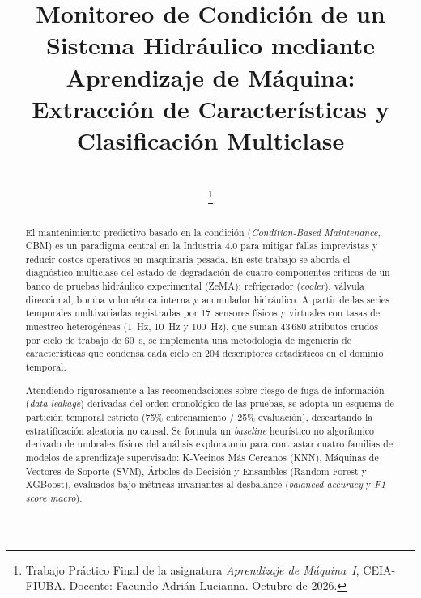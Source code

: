 \documentclass[journal]{IEEEtran}
\begin{document}
\title{Monitoreo de Condición de un Sistema Hidráulico mediante Aprendizaje de Máquina: Extracción de Características y Clasificación Multiclase}

\author{
     \\
    \thanks{Trabajo Práctico Final de la asignatura \emph{Aprendizaje de Máquina~I}, CEIA-FIUBA. Docente: Facundo Adrián Lucianna. Octubre de 2026.}
}

\maketitle

\begin{abstract}
El mantenimiento predictivo basado en la condición (\emph{Condition-Based Maintenance}, CBM) es un paradigma central en la Industria 4.0 para mitigar fallas imprevistas y reducir costos operativos en maquinaria pesada. En este trabajo se aborda el diagnóstico multiclase del estado de degradación de cuatro componentes críticos de un banco de pruebas hidráulico experimental (ZeMA): refrigerador (\emph{cooler}), válvula direccional, bomba volumétrica interna y acumulador hidráulico. A partir de las series temporales multivariadas registradas por 17~sensores físicos y virtuales con tasas de muestreo heterogéneas (\SI{1}{\hertz}, \SI{10}{\hertz} y \SI{100}{\hertz}), que suman 43\,680 atributos crudos por ciclo de trabajo de \SI{60}{\second}, se implementa una metodología de ingeniería de características que condensa cada ciclo en 204 descriptores estadísticos en el dominio temporal. 

Atendiendo rigurosamente a las recomendaciones sobre riesgo de fuga de información (\emph{data leakage}) derivadas del orden cronológico de las pruebas, se adopta un esquema de partición temporal estricto (75\% entrenamiento / 25\% evaluación), descartando la estratificación aleatoria no causal. Se formula un \emph{baseline} heurístico no algorítmico derivado de umbrales físicos del análisis exploratorio para contrastar cuatro familias de modelos de aprendizaje supervisado: K-Vecinos Más Cercanos (KNN), Máquinas de Vectores de Soporte (SVM), Árboles de Decisión y Ensambles (Random Forest y XGBoost), evaluados bajo métricas invariantes al desbalance (\emph{balanced accuracy} y \emph{F1-score macro}).
\end{abstract}
\end{document}

